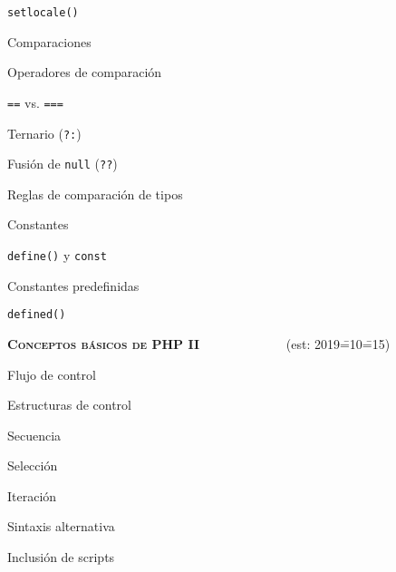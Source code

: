 \begin{longenum}
\begin{longenum}
\begin{longenum}
\begin{longenum}
\begin{longenum}
                    \begin{longenum}
                        \item \texttt{setlocale()}
                    \end{longenum}
                \end{longenum}
            \end{longenum}
            \item Comparaciones
            \begin{longenum}
                \item Operadores de comparación
                \item \texttt{==} vs. \texttt{===}
                \item Ternario (\texttt{?:})
                \item Fusión de \texttt{null} (\texttt{??})
                \item Reglas de comparación de tipos
            \end{longenum}
        \end{longenum}
        \item Constantes
        \begin{longenum}
            \item \texttt{define()} y \texttt{const}
            \item Constantes predefinidas
            \item \texttt{defined()}
        \end{longenum}
    \end{longenum}
    \item \textbf{\textsc{Conceptos básicos de PHP II}} \ \ \ \ \ \ \ \ \ \ \ \ \ (est: 2019\==10\==15)
    \begin{longenum}
        \item Flujo de control
        \begin{longenum}
            \item Estructuras de control
            \begin{longenum}
                \item Secuencia
                \item Selección
                \item Iteración
                \item Sintaxis alternativa
            \end{longenum}
            \item Inclusión de scripts

\end{longenum}
\end{longenum}
\end{longenum}
